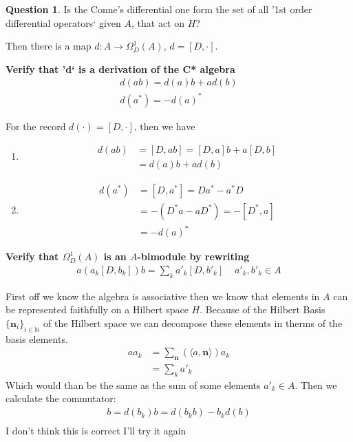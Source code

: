 \documentclass[a4paper]{article}
\newcounter{exercise}
\newenvironment{MyExercise}%
{\begin{mdframed}[style=exercisestyle]}{\end{mdframed}}
\theoremstyle{definition}
\theoremstyle{definition}
\newtheorem{question}{Question}
\theoremstyle{definition}
\theoremstyle{theorem}
\theoremstyle{theorem}
\begin{document}
\begin{question}
    Is the Conne's differential one form  the set of all '1st order
    differential operators` given $A$, that act on $H$?
\end{question}
Then there is a map $d:A\rightarrow \Omega _D ^1 (A)$, $d = [D, \cdot]$.
\begin{MyExercise}
    \textbf{
    Verify that 'd` is a derivation of the C* algebra
    \begin{align*}
        d(ab) = d(a)b + ad(b) \\
        d(a^*) = -d(a)^*
    \end{align*}
}\newline

    For the record $d(\cdot) = [D, \cdot]$, then we have
    \begin{enumerate}
        \item
            \begin{align*}
                d(ab) &= [D, ab] = [D, a]b + a[D,b]\\
                &= d(a)b + ad(b)
            \end{align*}
        \item
            \begin{align*}
                d(a^*) &= [D, a^*] = Da^* - a^*D \\
                &=-(D^*a - aD^*) = -[D^*, a] \\
                &= -d(a)^*
            \end{align*}
    \end{enumerate}
\end{MyExercise}
\begin{MyExercise}
    \textbf{
    Verify that $\Omega _D^1 (A)$ is an $A$-bimodule by rewriting
    }
    \begin{align*}
        a(a_k[D, b_k])b = \sum_k a'_k[D, b'_k] \;\;\;\; a'_k, b'_k \in A
    \end{align*}
    \newline

    First off we know the algebra is associative then we know that elements
    in $A$ can be represented faithfully on a Hilbert space $H$. Because of
    the Hilbert Basis $\{\textbf{n}_i\}_{i\in \mathbb{N}}$ of the Hilbert space we can decompose these elements
    in therms of the basis elements.
    \begin{align*}
        aa_k &= \sum _{\textbf{n}}(\langle a, \textbf{n} \rangle) a_k \\
        &= \sum _{k} a'_{k}
    \end{align*}
    Which would than be the same as the sum of some elements
    $a'_{k} \in A$. Then we calculate the commutator:
    \begin{align*}
        [D, b_k] b = d(b_k)b = d(b_kb) - b_kd(b)\\
    \end{align*}
I don't think this is correct I'll try it again
\end{MyExercise}
\end{document}
